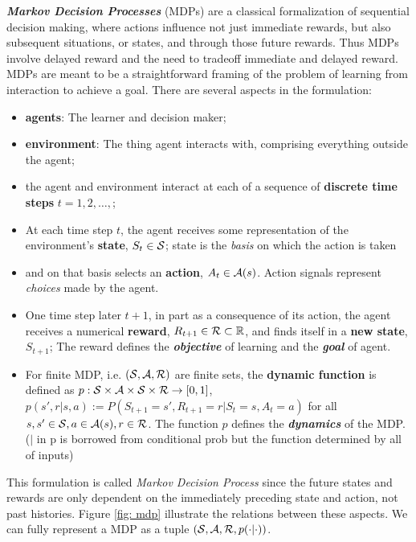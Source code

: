 \documentclass[11pt]{article}
\begin{document}
\textbf{\emph{Markov Decision Processes}} (MDPs) are a classical formalization of sequential decision making, where actions influence not just immediate rewards, but also subsequent situations, or states, and through those future rewards. Thus MDPs involve delayed reward and the need to tradeoff immediate and delayed reward.  MDPs are meant to be a straightforward framing of the problem of learning from interaction to achieve a goal. There are several aspects in the formulation:
\begin{itemize}
\item \textbf{agents}: The learner and decision maker;
\item \textbf{environment}: The thing agent interacts with, comprising everything outside the agent;
\item the agent and environment interact at each of a sequence of \textbf{discrete time steps} $t=1,2,\ldots,$;
\item At each time step $t$, the agent receives some representation of the environment’s \textbf{state}, $S_t \in  {\mathcal S}$; state is the \emph{basis} on which the action is taken
\item and on that basis selects an \textbf{action}, $A_t \in {\mathcal A}(s)$. Action signals represent \emph{choices} made by the agent.
\item One time step later $t+1$, in part as a consequence of its action, the agent receives a numerical \textbf{reward}, $R_{t+1} \in {\mathcal R} \subset {\mathbb R}$, and finds itself in a \textbf{new state}, $S_{t+1}$; The reward defines the \emph{\textbf{objective}} of learning and the \emph{\textbf{goal}} of agent. 
\item For finite MDP, i.e. $({\mathcal S}, {\mathcal A}, {\mathcal R})$ are finite sets,  the \textbf{dynamic function} is defined as $p: {\mathcal S} \times {\mathcal A} \times {\mathcal S} \times {\mathcal R} \rightarrow [0,1]$, $p(s', r| s, a):= P( S_{t+1}=s',R_{t+1}=r| S_{t}=s, A_{t}=a)$ for all $s,s' \in {\mathcal S}, a\in {\mathcal A}(s), r\in {\mathcal R}$. The function $p$ defines the \emph{\textbf{dynamics}} of the MDP. ($|$ in p is borrowed from conditional prob but the function determined by all of inputs)
\end{itemize} This formulation is called \emph{Markov Decision Process} since the future states and rewards are only dependent on the immediately preceding state and action, not past histories.  Figure \ref{fig: mdp} illustrate the relations between these aspects. We can fully represent a MDP as a tuple $({\mathcal S}, {\mathcal A}, {\mathcal R}, p(\cdot|\cdot))$.
\end{document}
